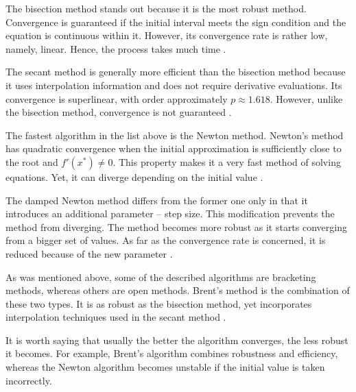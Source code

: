 The bisection method stands out because it is the most robust method. Convergence is guaranteed if the initial interval meets the sign condition and the equation is continuous within it. However, its convergence rate is rather low, namely, linear. Hence, the process takes much time \cite{burden, atkinson}.

The secant method is generally more efficient than the bisection method because it uses interpolation information and does not require derivative evaluations. Its convergence is superlinear, with order approximately \(p \approx 1.618\). However, unlike the bisection method, convergence is not guaranteed \cite{kelley}.

The fastest algorithm in the list above is the Newton method. Newton's method has quadratic convergence when the initial approximation is sufficiently close to the root and \(f'(x^*) \neq 0\). This property makes it a very fast method of solving equations. Yet, it can diverge depending on the initial value \cite{burden, kelley}.

The damped Newton method differs from the former one only in that it introduces an additional parameter – step size. This modification prevents the method from diverging. The method becomes more robust as it starts converging from a bigger set of values. As far as the convergence rate is concerned, it is reduced because of the new parameter \cite{kelley, nocedal}.

As was mentioned above, some of the described algorithms are bracketing methods, whereas others are open methods. Brent's method is the combination of these two types. It is as robust as the bisection method, yet incorporates interpolation techniques used in the secant method \cite{chapra, cs357}.

It is worth saying that usually the better the algorithm converges, the less robust it becomes. For example, Brent's algorithm combines robustness and efficiency, whereas the Newton algorithm becomes unstable if the initial value is taken incorrectly.